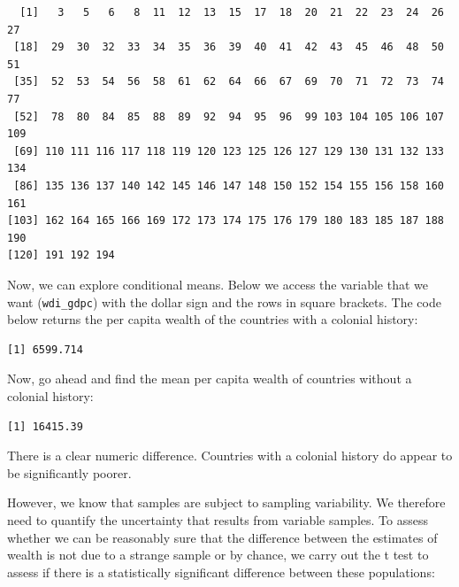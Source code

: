 \documentclass[]{article}
\newenvironment{Shaded}{\begin{snugshade}}{\end{snugshade}}
\newcommand{\DataTypeTok}[1]{\textcolor[rgb]{0.13,0.29,0.53}{#1}}
\newcommand{\DecValTok}[1]{\textcolor[rgb]{0.00,0.00,0.81}{#1}}
\newcommand{\KeywordTok}[1]{\textcolor[rgb]{0.13,0.29,0.53}{\textbf{#1}}}
\newcommand{\NormalTok}[1]{#1}
\newcommand{\OperatorTok}[1]{\textcolor[rgb]{0.81,0.36,0.00}{\textbf{#1}}}
\newcommand{\OtherTok}[1]{\textcolor[rgb]{0.56,0.35,0.01}{#1}}
\newcommand{\StringTok}[1]{\textcolor[rgb]{0.31,0.60,0.02}{#1}}
\begin{document}
\begin{verbatim}
  [1]   3   5   6   8  11  12  13  15  17  18  20  21  22  23  24  26  27
 [18]  29  30  32  33  34  35  36  39  40  41  42  43  45  46  48  50  51
 [35]  52  53  54  56  58  61  62  64  66  67  69  70  71  72  73  74  77
 [52]  78  80  84  85  88  89  92  94  95  96  99 103 104 105 106 107 109
 [69] 110 111 116 117 118 119 120 123 125 126 127 129 130 131 132 133 134
 [86] 135 136 137 140 142 145 146 147 148 150 152 154 155 156 158 160 161
[103] 162 164 165 166 169 172 173 174 175 176 179 180 183 185 187 188 190
[120] 191 192 194
\end{verbatim}

Now, we can explore conditional means. Below we access the variable that we want (\texttt{wdi\_gdpc}) with the dollar sign and the rows in square brackets. The code below returns the per capita wealth of the countries with a colonial history:

\begin{Shaded}
\end{Shaded}

\begin{verbatim}
[1] 6599.714
\end{verbatim}

Now, go ahead and find the mean per capita wealth of countries without a colonial history:

\begin{Shaded}
\end{Shaded}

\begin{verbatim}
[1] 16415.39
\end{verbatim}

There is a clear numeric difference. Countries with a colonial history do appear to be significantly poorer.

However, we know that samples are subject to sampling variability. We therefore need to quantify the uncertainty that results from variable samples. To assess whether we can be reasonably sure that the difference between the estimates of wealth is not due to a strange sample or by chance, we carry out the t test to assess if there is a statistically significant difference between these populations:
\end{document}
